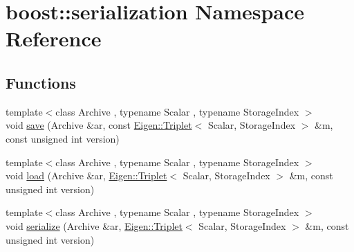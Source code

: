 \hypertarget{namespaceboost_1_1serialization}{\section{boost\-:\-:serialization Namespace Reference}
\label{namespaceboost_1_1serialization}
}
\subsection*{Functions}
\begin{DoxyCompactItemize}
\item 
{\footnotesize template$<$class Archive , typename Scalar , typename Storage\-Index $>$ }\\void \hyperlink{namespaceboost_1_1serialization_a07151466c234a9cbebb5adf3010fb1dd}{save} (Archive \&ar, const \hyperlink{class_eigen_1_1_triplet}{Eigen\-::\-Triplet}$<$ Scalar, Storage\-Index $>$ \&m, const unsigned int version)
\item 
{\footnotesize template$<$class Archive , typename Scalar , typename Storage\-Index $>$ }\\void \hyperlink{namespaceboost_1_1serialization_a3276a16d6b3ec1d1c9ed379b9dc841ca}{load} (Archive \&ar, \hyperlink{class_eigen_1_1_triplet}{Eigen\-::\-Triplet}$<$ Scalar, Storage\-Index $>$ \&m, const unsigned int version)
\item 
{\footnotesize template$<$class Archive , typename Scalar , typename Storage\-Index $>$ }\\void \hyperlink{namespaceboost_1_1serialization_ad0a2183c60ba03839970735298a74151}{serialize} (Archive \&ar, \hyperlink{class_eigen_1_1_triplet}{Eigen\-::\-Triplet}$<$ Scalar, Storage\-Index $>$ \&m, const unsigned int version)
\end{DoxyCompactItemize}


